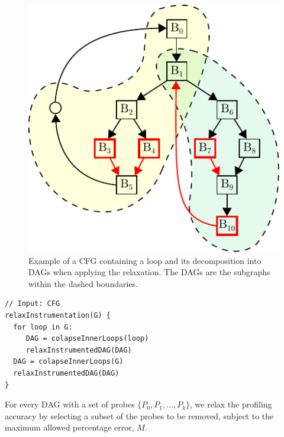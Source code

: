 \documentclass[sigplan,10pt]{acmart}
\theoremstyle{definition}
\begin{document}
\begin{figure}[h]
  \centering
  \includegraphics[scale=1]{figs/cfg-relax-example.pdf}
  \caption{Example of a CFG containing a loop and its decomposition into DAGs when applying the relaxation.
           The DAGs are the subgraphs within the dashed boundaries.}
  \label{fig:cfg-relax-example}
\end{figure}

\newpage
\begin{lstlisting}[caption={Optimal placement of probes for block frequency.}, label={lst:instrumentCFG}]
// Input: CFG	
relaxInstrumentation(G) {
  for loop in G:
     DAG = colapseInnerLoops(loop)
     relaxInstrumentedDAG(DAG)
  DAG = colapseInnerLoops(G)
  relaxInstrumentedDAG(DAG)
}
\end{lstlisting}

For every DAG with a set of probes $\{P_0, P_1, \ldots, P_k\}$, we relax the profiling accuracy by selecting a subset of the probes to be removed, subject to the maximum allowed percentage error, $M$.
\end{document}
